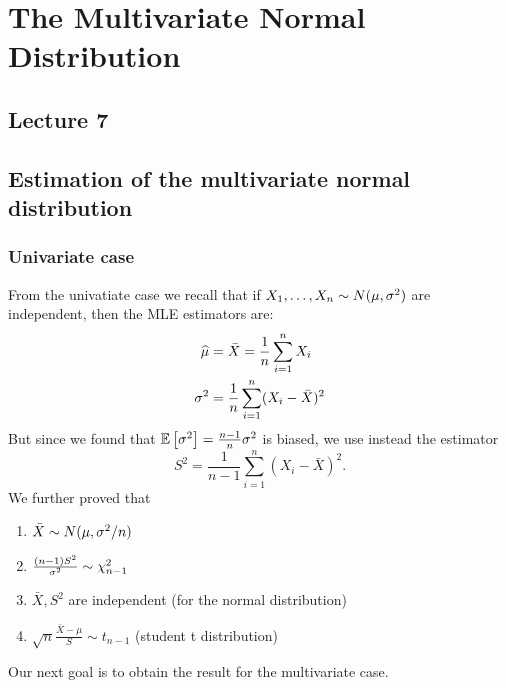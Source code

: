 \section{The Multivariate Normal Distribution}
\subsection*{Lecture 7}

\subsection{Estimation of the multivariate normal distribution}
\subsubsection{Univariate case}
From the univatiate case we recall that if $X_1,\dots,X_n \sim N(\mu, {\sigma^2})$ are independent, then the MLE estimators are:
\begin{align*}
    \widehat{\mu} &= \bar{X} = \frac{1}{n} \sum_{i=1}^n X_i \\
    \sigma^2 &= \frac{1}{n} \sum_{i=1}^n (X_i-\bar{X})^2
\end{align*}
But since we found that $\mathbb{E}\left[\sigma^2\right]=\frac{n-1}{n} \sigma^2$ is biased, we use instead the estimator
$$
    S^2 = \frac{1}{n-1} \sum_{i=1}^n (X_i-\bar{X})^2.
$$
We further proved that
\begin{enumerate}
    \item $\bar{X} \sim N(\mu, \sigma^2/n)$
    \item $\frac{(n-1)S^2}{\sigma^2} \sim \chi^2_{n-1}$
    \item $\bar{X}, S^2$ are independent (for the normal distribution)
    \item $\sqrt{n} \frac{\bar{X}-\mu}{S} \sim t_{n-1}$ (student t distribution)
\end{enumerate}
Our next goal is to obtain the result for the multivariate case. 
